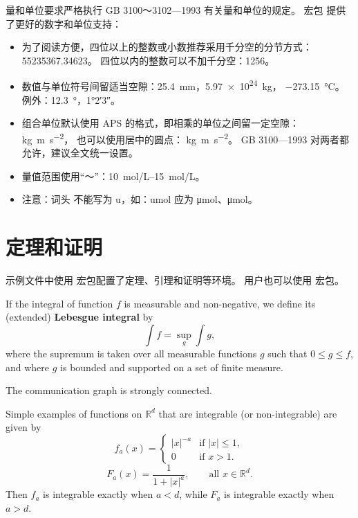 量和单位要求严格执行 GB 3100～3102—1993 有关量和单位的规定。
宏包  提供了更好的数字和单位支持：
\begin{itemize}
  \item 为了阅读方便，四位以上的整数或小数推荐采用千分空的分节方式：\num{55235367.34623}。
    四位以内的整数可以不加千分空：\num{1256}。
  \item 数值与单位符号间留适当空隙：\SI{25.4}{mm}，\SI{5.97e24}{\kilo\gram}，
    \SI{-273.15}{\degreeCelsius}。 例外：\SI{12.3}{\degree}，\ang{1;2;3}。
  \item 组合单位默认使用 APS 的格式，即相乘的单位之间留一定空隙： \si{kg.m.s^{-2}}，
    也可以使用居中的圆点： \si[inter-unit-product = \ensuremath{{}\cdot{}}]{kg.m.s^{-2}}。
    GB 3100—1993 对两者都允许，建议全文统一设置。
  \item 量值范围使用“～”：\SIrange{10}{15}{mol/L}。
  \item 注意：词头 \textmu{} 不能写为 u，如：\si{umol} 应为 \si{\micro\mole}、\si{\umol}。
\end{itemize}



\section{定理和证明}

示例文件中使用  宏包配置了定理、引理和证明等环境。
用户也可以使用  宏包。

\begin{definition}
  If the integral of function $f$ is measurable and non-negative, we define
  its (extended) \textbf{Lebesgue integral} by
  \begin{equation}
    \int f = \sup_g \int g,
  \end{equation}
  where the supremum is taken over all measurable functions $g$ such that
  $0 \le g \le f$, and where $g$ is bounded and supported on a set of
  finite measure.
\end{definition}

\begin{assumption}
The communication graph is strongly connected.
\end{assumption}

\begin{example}
  Simple examples of functions on $\mathbb{R}^d$ that are integrable
  (or non-integrable) are given by
  \begin{equation}
    f_a(x) =
    \begin{cases}
      |x|^{-a} & \text{if } |x| \le 1, \\
      0        & \text{if } x > 1.
    \end{cases}
  \end{equation}
  \begin{equation}
    F_a(x) = \frac{1}{1 + |x|^a}, \qquad \text{all } x \in \mathbb{R}^d.
  \end{equation}
  Then $f_a$ is integrable exactly when $a < d$, while $F_a$ is integrable
  exactly when $a > d$.
\end{example}

